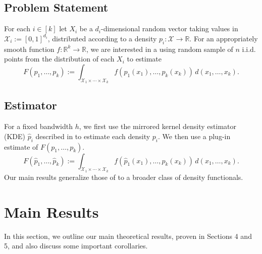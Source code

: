 \documentclass{article} %
\newcommand{\R}{\mathbb{R}}                         %
\newcommand{\X}{\mathcal{X}}                        %
\begin{document}
\subsection{Problem Statement}
For each $i \in [k]$ let $X_i$ be a $d_i$-dimensional random vector taking
values in $\X_i := [0,1]^{d_i}$, distributed according to a density
$p_i : \X \to \R$. For an appropriately smooth function $f : \R^k \to \R$, we
are interested in a using random sample of $n$ i.i.d. points from the
distribution of each $X_i$ to estimate
\begin{equation}
F(p_1,\dots,p_k)
    := \int_{\X_1 \times \cdots \times \X_k}
        f(p_1(x_1),\dots,p_k(x_k)) \, d(x_1,\dots,x_k).
\label{eq:df_form}
\end{equation}

\subsection{Estimator}
For a fixed bandwidth $h$, we first use the mirrored kernel density estimator
(KDE) $\hat p_i$ described in \citep{singh14exponential} to estimate each
density $p_i$. We then use a plug-in estimate of $F(p_1,\dots,p_k)$.
\[F(\hat p_1,\dots,\hat p_k)
    := \int_{\X_1 \times \cdots \times \X_k}
        f(\hat p_1(x_1),\dots,\hat p_k(x_k)) \, d(x_1,\dots,x_k).
\]
Our main results generalize those of \citep{singh14exponential} to a broader
class of density functionals.

\section{Main Results}
In this section, we outline our main theoretical results, proven in Sections 4
and 5, and also discuss some important corollaries.
\end{document}
